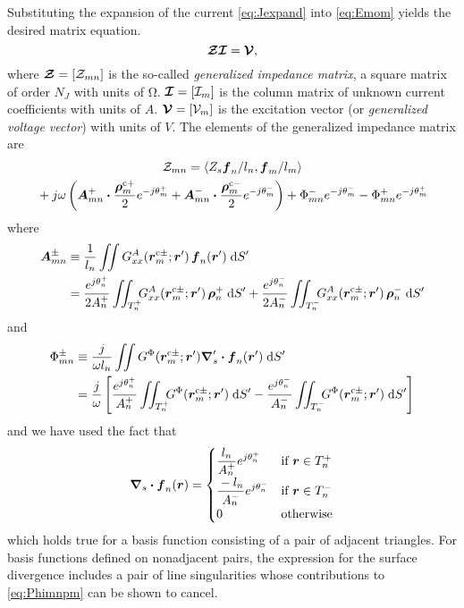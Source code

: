 Substituting the expansion of the current \eqref{eq:Jexpand} into \eqref{eq:Emom}
yields the desired matrix equation.
\begin{equation}
  \boldsymbol{\mathcal{Z}} \boldsymbol{\mathcal{I}} =  \boldsymbol{\mathcal{V}},  \label{eq:matrix}
\end{equation}
where $\boldsymbol{\mathcal{Z}} = [\mathcal{Z}_{mn}]$ is the so-called {\em generalized impedance 
matrix}, a square matrix of order $N_J$ with units of \si{\ohm}.  
$\boldsymbol{\mathcal{I}} = [\mathcal{I}_m]$ is the column matrix of unknown current
coefficients with units of $\si{A}$. 
$\boldsymbol{\mathcal{V}}= [\mathcal{V}_m]$ is the excitation vector (or {\em generalized
voltage vector}) with units of $\si{V}$.
The elements of the generalized impedance matrix are
\begin{multline}
  \mathcal{Z}_{mn} = 
  \left< Z_s \boldsymbol{f}_n/l_n,\boldsymbol{f}_m/l_m \right>
   \\
   \mbox{} + j \omega \left(
    \boldsymbol{A}_{mn}^+ \boldsymbol{\cdot} \frac{\boldsymbol{\rho}^{\text{c}+}_m}{2} e^{-j\theta_m^+}
    +
    \boldsymbol{A}_{mn}^- \boldsymbol{\cdot} \frac{\boldsymbol{\rho}^{\text{c}-}_m}{2} e^{-j\theta_m^-}
  \right)
  + \Phi_{mn}^- e^{-j\theta_m^-} - \Phi_{mn}^+ e^{-j\theta_m^+}
\end{multline}
where
\begin{align}
  \boldsymbol{A}_{mn}^{\pm} & \equiv 
  \frac{1}{l_n} \iint  
  G^A_{xx}(\boldsymbol{r}^{\text{c}\pm}_m;\boldsymbol{r}') \, \boldsymbol{f}_n(\boldsymbol{r}') \; \text{d} S'  \notag \\
  &= 
    \frac{e^{j\theta_n^+}}{2A_n^+} \iint_{T_n^+}  \!\!\!
    G^A_{xx}(\boldsymbol{r}^{\text{c}\pm}_m;\boldsymbol{r}') \, \boldsymbol{\rho}_n^+ \; \text{d} S'
    +
    \frac{e^{j\theta_n^-}}{2A_n^-} \iint_{T_n^-}  \!\!\!
    G^A_{xx}(\boldsymbol{r}^{\text{c}\pm}_m;\boldsymbol{r}')  \, \boldsymbol{\rho}_n^- \; \text{d} S'
    \label{eq:Amnpm}
\end{align}
and
\begin{align}
  \Phi_{mn}^{\pm} &\equiv \frac{j}{\omega l_n} \iint
  {G}^{\Phi}(\boldsymbol{r}^{\text{c}\pm}_m;\boldsymbol{r}')
  \boldsymbol{\nabla}'_s \boldsymbol{\cdot} \boldsymbol{f}_n(\boldsymbol{r}')  
  \; \text{d} S'
  \notag \\
  &= \frac{j}{\omega}
  \left[
    \frac{e^{j\theta_n^+}}{A_n^+} \iint_{T_n^+}  \!\!\!
    {G}^{\Phi}(\boldsymbol{r}^{\text{c}\pm}_m;\boldsymbol{r}') \; \text{d} S'
    -
    \frac{e^{j\theta_n^-}}{A_n^-} \iint_{T_n^-}{}  \!\!\!
    {G}^{\Phi}(\boldsymbol{r}^{\text{c}\pm}_m;\boldsymbol{r}') \; \text{d} S'
  \right]    \label{eq:Phimnpm}
\end{align}
and we have used the fact \cite{rawg:82} that
\begin{equation}  
  \gradient_s \bdot \f_n(\r) = 
  \begin{cases}
    \displaystyle  \frac{l_n}{A_n^+} e^{j\theta_n^+}  & \text{if $\r \in T_n^+$} \\
    \displaystyle \frac{\rule{0pt}{2ex}-l_n}{A_n^-} 
    e^{j\theta_n^-} & \text{if $\r \in T_n^-$} \\
    0                               & \text{otherwise}
  \end{cases}
  \label{eq:fdiv}
\end{equation}    
which holds true for a basis function consisting of a pair of adjacent
triangles.  For basis functions defined on nonadjacent pairs, the
expression for the surface divergence includes a pair of line
singularities whose contributions to \eqref{eq:Phimnpm} can be
shown to cancel.


